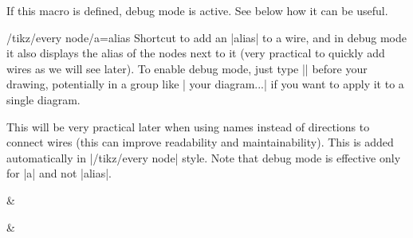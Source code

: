 \documentclass[a4paper,doc2]{ltxdoc} %
\begin{document}
{\begin{command}{\zxDebugMode{}}
  If this macro is defined, debug mode is active. See below how it can be useful.
\end{command}
\begin{stylekey}{/tikz/every node/a=alias}
  Shortcut to add an |alias| to a wire, and in debug mode it also displays the alias of the nodes next to it (very practical to quickly add wires as we will see later). To enable debug mode, just type |\def\zxDebugMode{}| before your drawing, potentially in a group like |{\def\zxDebugMode{} your diagram...}| if you want to apply it to a single diagram.

  This will be very practical later when using names instead of directions to connect wires (this can improve readability and maintainability). This is added automatically in |/tikz/every node| style. Note that debug mode is effective only for |a| and not |alias|.
\begin{codeexample}[width=3cm]
  \begin{ZX}
    \zxX[a=A]{} & \zxZ[a=B]{\beta}
    \ar[from=A,to=B]
  \end{ZX}
  {\def\zxDebugMode{} %
    \begin{ZX}
      \zxX[a=A]{} & \zxZ[a=B]{\beta}
      \ar[from=A,to=B]
    \end{ZX}
  }
\end{codeexample}
\end{stylekey}

}
\end{document}
